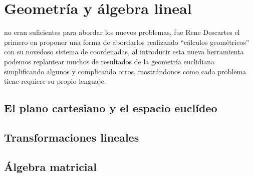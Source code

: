 \chapter{Geometría y álgebra lineal} %
\label{cha:geometria_y_algebra_lineal}

\noindent {} no eran suficientes para abordar los nuevos problemas, fue Rene
Descartes el primero en proponer una forma de abordarlos realizando ``cálculos
geométricos'' con su novedoso sistema de coordenadas, al introducir esta nueva
herramienta podemos replantear muchos de resultados de la geometría euclidiana 
simplificando algunos y complicando otros, mostrándonos como cada problema tiene
requiere su  propio lenguaje.

\section{El plano cartesiano y el espacio euclídeo} %
\label{sec:el_plano_cartesiano_y_el_espacio_euclideo}

\section{Transformaciones lineales} %
\label{sec:transformaciones_lineales}

\section{Álgebra matricial} %
\label{sec:algebra_matricial}





